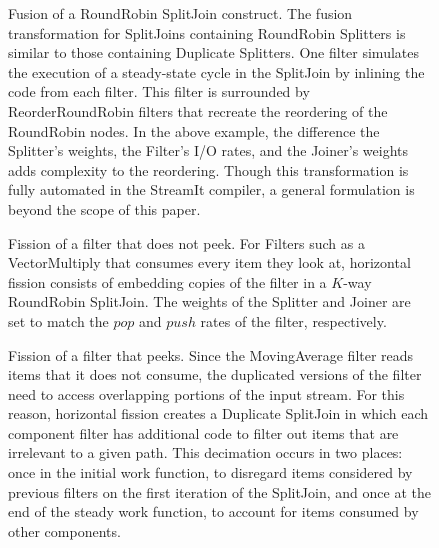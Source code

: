 \begin{figure}
\centering
{}
\caption{\protect\small Fusion of a RoundRobin SplitJoin construct.
The fusion transformation for SplitJoins containing RoundRobin
Splitters is similar to those containing Duplicate Splitters.  One
filter simulates the execution of a steady-state cycle in the
SplitJoin by inlining the code from each filter.  This filter is
surrounded by ReorderRoundRobin filters that recreate the reordering of
the RoundRobin nodes.  In the above example, the difference the
Splitter's weights, the Filter's I/O rates, and the Joiner's weights
adds complexity to the reordering.  Though this transformation is
fully automated in the StreamIt compiler, a general formulation is
beyond the scope of this paper.  \protect\label{fig:fuse-splitjoin2}}
\end{figure}

\begin{figure}
\centering
{}
\caption{\protect\small Fission of a filter that does not peek.  For
Filters such as a VectorMultiply that consumes every item they look
at, horizontal fission consists of embedding copies of the filter in a
$K$-way RoundRobin SplitJoin.  The weights of the Splitter and Joiner
are set to match the $pop$ and $push$ rates of the filter,
respectively.  \protect\label{fig:fission-nopeek}}
\end{figure}

\begin{figure}
\centering
{}
\caption{\protect\small Fission of a filter that peeks.  Since the
MovingAverage filter reads items that it does not consume, the
duplicated versions of the filter need to access overlapping portions
of the input stream.  For this reason, horizontal fission creates a
Duplicate SplitJoin in which each component filter has additional code
to filter out items that are irrelevant to a given path.  This
decimation occurs in two places: once in the initial work function, to
disregard items considered by previous filters on the first iteration
of the SplitJoin, and once at the end of the steady work function, to
account for items consumed by other components.
\protect\label{fig:fission-peek}}
\end{figure}

